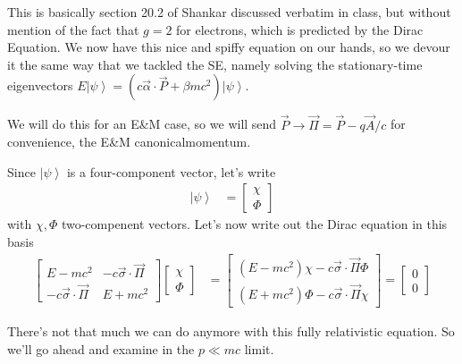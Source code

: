 \documentclass[12pt]{article}
\newcommand{\ket}[1]{\left|#1\right>}
\begin{document}
This is basically section 20.2 of Shankar discussed verbatim in class, but without mention of the fact that $g=2$ for electrons, which is predicted by the Dirac Equation. We now have this nice and spiffy equation on our hands, so we devour it the same way that we tackled the SE, namely solving the stationary-time eigenvectors $E\ket{\psi} = \left( c\vec{\alpha} \cdot \vec{P} + \beta mc^2 \right)\ket{\psi}$. 

We will do this for an E\&M case, so we will send $\vec{P} \to \vec{\Pi} = \vec{P} - q\vec{A}/c$ for convenience, the E\&M canonicalmomentum.

Since $\ket{\psi}$ is a four-component vector, let's write
\begin{align}
    \ket{\psi} &= \begin{bmatrix} \chi\\ \Phi \end{bmatrix} 
\end{align}
with $\chi, \Phi$ two-compenent vectors. Let's now write out the Dirac equation in this basis
\begin{align}
    \begin{bmatrix} E-mc^2 & -c \vec{\sigma} \cdot \vec{\Pi} \\ -c\vec{\sigma} \cdot \vec{\Pi} & E + mc^2 \end{bmatrix} \begin{bmatrix} \chi \\ \Phi \end{bmatrix} &= \begin{bmatrix} \left( E - mc^2\right) \chi - c\vec{\sigma} \cdot \vec{\Pi} \Phi \\ \left( E + mc^2\right) \Phi - c\vec{\sigma} \cdot \vec{\Pi} \chi \end{bmatrix} = \begin{bmatrix} 0\\0 \end{bmatrix} \label{DiracMatrix}
\end{align}

There's not that much we can do anymore with this fully relativistic equation. So we'll go ahead and examine in the $p \ll mc$ limit.
\end{document}
